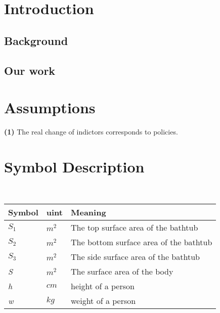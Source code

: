 \documentclass{mcmthesis}
\begin{document}
\setcounter{page}{1}
\section{Introduction}
\subsection{Background}%

\subsection{Our work}


\section{Assumptions}
\noindent
{\bf (1) } The real change of indictors corresponds to policies.\\

\section{Symbol Description}
\begin{table}[h]
        \setlength{\abovecaptionskip}{0pt}
        \setlength{\belowcaptionskip}{0pt}
         \\
        \begin{tabular}{p{3cm}|p{3cm}|p{6.6cm}}
        \hline
        \bf{Symbol}	&\bf{uint}      &\bf{Meaning}\\
        \hline
        $S_{1}$		& $m^2  $		 & The top surface area of the bathtub 	\\
        $S_{2}$		& $m^2  $		 & The bottom surface area of the bathtub 	\\
        $S_{3}$		& $m^2  $		 & The side surface area of the bathtub 	\\
        \emph{S}	& $m^2  $		 & The surface area of the body\\
        \emph{h}	& $cm	$        & height of a person \\
        \emph{w}	& $kg	$        & weight of a person \\
        \hline
        \end{tabular}
        \end{table}

\end{document}
